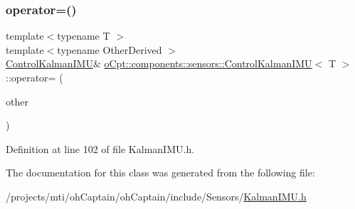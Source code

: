 \subsubsection{\texorpdfstring{operator=()}{operator=()}}
{\footnotesize\ttfamily template$<$typename T $>$ \\
template$<$typename Other\+Derived $>$ \\
\hyperlink{classo_cpt_1_1components_1_1sensors_1_1_control_kalman_i_m_u}{Control\+Kalman\+I\+MU}\& \hyperlink{classo_cpt_1_1components_1_1sensors_1_1_control_kalman_i_m_u}{o\+Cpt\+::components\+::sensors\+::\+Control\+Kalman\+I\+MU}$<$ T $>$\+::operator= (\begin{DoxyParamCaption}\item[{const Eigen\+::\+Matrix\+Base$<$ Other\+Derived $>$ \&}]{other }\end{DoxyParamCaption})\hspace{0.3cm}{\ttfamily [inline]}}



Definition at line 102 of file Kalman\+I\+M\+U.\+h.



The documentation for this class was generated from the following file\+:\begin{DoxyCompactItemize}
\item 
/projects/mti/oh\+Captain/oh\+Captain/include/\+Sensors/\hyperlink{_kalman_i_m_u_8h}{Kalman\+I\+M\+U.\+h}\end{DoxyCompactItemize}
